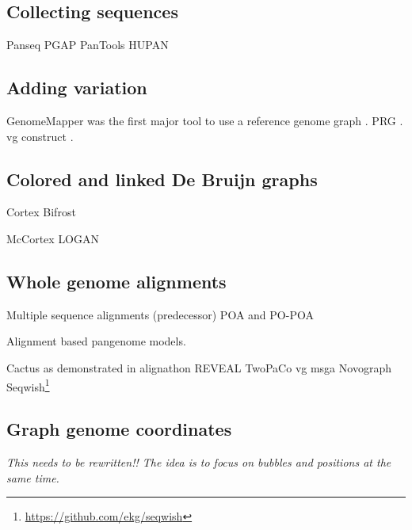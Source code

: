 \subsection{Collecting sequences}

Panseq \cite{Laing_2010}
PGAP \cite{Zhao_2011}
PanTools  \cite{Sheikhizadeh_Anari_2018}
HUPAN \citep{Duan_2019}

\subsection{Adding variation}

GenomeMapper was the first major tool to use a reference genome graph \cite{Schneeberger_2009}.
PRG \cite{dilthey2015improved}.
vg construct \cite{Garrison_2018}.

\subsection{Colored and linked De Bruijn graphs}

Cortex \cite{Iqbal_2012}
Bifrost \cite{holley2019bifrost}

McCortex \cite{Turner_2018}
LOGAN \cite{Bolger_2017}

\subsection{Whole genome alignments}

Multiple sequence alignments (predecessor) POA and PO-POA \cite{Lee_2002,Grasso_2004} %

Alignment based pangenome models.

Cactus \cite{Paten_2011} as demonstrated in alignathon \cite{earl2014alignathon}
REVEAL \cite{linthorst2015scalable}
TwoPaCo \cite{Minkin_2016}
vg msga \cite{Novak_2017a,Garrison_2018,Garrison_2019}
Novograph \cite{Biederstedt2018}
Seqwish\footnote{\url{https://github.com/ekg/seqwish}} \cite{Garrison_2019}


\subsection{Graph genome coordinates}

\textit{This needs to be rewritten!! The idea is to focus on bubbles and positions at the same time.} \cite{Rand_2016}

